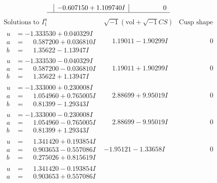 \documentclass[1p]{elsarticle_modified}
\theoremstyle{definition}
\newcommand{\I}{\sqrt{-1}}
\begin{document}
$$\begin{array}{c|c|c}
 & -0.607150 + 1.109740 I & \phantom{-0.000000 } 0\\
 \hline 
 \end{array}$$\newpage$$\begin{array}{c|c|c}  
\text{Solutions to }I^u_{1}& \I (\text{vol} + \sqrt{-1}CS) & \text{Cusp shape}\\
 \hline 
\begin{aligned}
u &= -1.333530 + 0.040329 I \\
a &= \phantom{-}0.587200 + 0.036810 I \\
b &= \phantom{-}1.35622 - 1.13947 I\end{aligned}
 & \phantom{-}1.19011 - 1.90299 I & \phantom{-0.000000 } 0 \\ \hline\begin{aligned}
u &= -1.333530 - 0.040329 I \\
a &= \phantom{-}0.587200 - 0.036810 I \\
b &= \phantom{-}1.35622 + 1.13947 I\end{aligned}
 & \phantom{-}1.19011 + 1.90299 I & \phantom{-0.000000 } 0 \\ \hline\begin{aligned}
u &= -1.333000 + 0.230008 I \\
a &= \phantom{-}1.054960 + 0.765005 I \\
b &= \phantom{-}0.81399 - 1.29343 I\end{aligned}
 & \phantom{-}2.88699 + 9.95019 I & \phantom{-0.000000 } 0 \\ \hline\begin{aligned}
u &= -1.333000 - 0.230008 I \\
a &= \phantom{-}1.054960 - 0.765005 I \\
b &= \phantom{-}0.81399 + 1.29343 I\end{aligned}
 & \phantom{-}2.88699 - 9.95019 I & \phantom{-0.000000 } 0 \\ \hline\begin{aligned}
u &= \phantom{-}1.341420 + 0.193854 I \\
a &= \phantom{-}0.903653 - 0.557086 I \\
b &= \phantom{-}0.275026 + 0.815619 I\end{aligned}
 & -1.95121 - 1.33658 I & \phantom{-0.000000 } 0 \\ \hline\begin{aligned}
u &= \phantom{-}1.341420 - 0.193854 I \\
a &= \phantom{-}0.903653 + 0.557086 I \\

\end{aligned}
\end{array}$$
\end{document}
